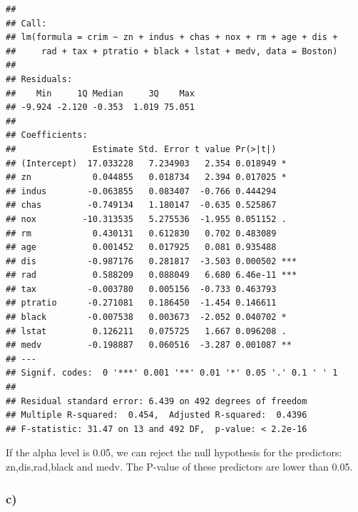 \documentclass[]{article}
\begin{document}
\begin{verbatim}
## 
## Call:
## lm(formula = crim ~ zn + indus + chas + nox + rm + age + dis + 
##     rad + tax + ptratio + black + lstat + medv, data = Boston)
## 
## Residuals:
##    Min     1Q Median     3Q    Max 
## -9.924 -2.120 -0.353  1.019 75.051 
## 
## Coefficients:
##               Estimate Std. Error t value Pr(>|t|)    
## (Intercept)  17.033228   7.234903   2.354 0.018949 *  
## zn            0.044855   0.018734   2.394 0.017025 *  
## indus        -0.063855   0.083407  -0.766 0.444294    
## chas         -0.749134   1.180147  -0.635 0.525867    
## nox         -10.313535   5.275536  -1.955 0.051152 .  
## rm            0.430131   0.612830   0.702 0.483089    
## age           0.001452   0.017925   0.081 0.935488    
## dis          -0.987176   0.281817  -3.503 0.000502 ***
## rad           0.588209   0.088049   6.680 6.46e-11 ***
## tax          -0.003780   0.005156  -0.733 0.463793    
## ptratio      -0.271081   0.186450  -1.454 0.146611    
## black        -0.007538   0.003673  -2.052 0.040702 *  
## lstat         0.126211   0.075725   1.667 0.096208 .  
## medv         -0.198887   0.060516  -3.287 0.001087 ** 
## ---
## Signif. codes:  0 '***' 0.001 '**' 0.01 '*' 0.05 '.' 0.1 ' ' 1
## 
## Residual standard error: 6.439 on 492 degrees of freedom
## Multiple R-squared:  0.454,  Adjusted R-squared:  0.4396 
## F-statistic: 31.47 on 13 and 492 DF,  p-value: < 2.2e-16
\end{verbatim}

If the alpha level is 0.05, we can reject the null hypothesis for the
predictors: zn,dis,rad,black and medv. The P-value of these predictors
are lower than 0.05.

\subsubsection{c)}\label{c-3}
\end{document}
